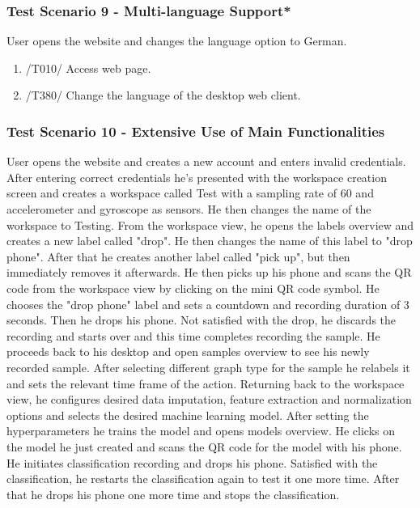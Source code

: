\subsubsection{Test Scenario 9 - Multi-language Support*}
User opens the website and changes the language option to German. 
\begin{enumerate}
    \item /T010/ Access web page.
    \item /T380/ Change the language of the desktop web client.
\end{enumerate}
\subsubsection{Test Scenario 10 - Extensive Use of Main Functionalities}
User opens the website and creates a new account and enters invalid credentials. After entering correct credentials he's presented with the workspace creation screen and creates a workspace called Test with a sampling rate of 60 and accelerometer and gyroscope as sensors. He then changes the name of the workspace to Testing. From the workspace view, he opens the labels overview and creates a new label called "drop". He then changes the name of this label to "drop phone". After that he creates another label called "pick up", but then immediately removes it afterwards. He then picks up his phone and scans the QR code from the workspace view by clicking on the mini QR code symbol. He chooses the "drop phone" label and sets a countdown and recording duration of 3 seconds. Then he drops his phone. Not satisfied with the drop, he discards the recording and starts over and this time completes recording the sample. He proceeds back to his desktop and open samples overview to see his newly recorded sample. After selecting different graph type for the sample he relabels it and sets the relevant time frame of the action. Returning back to the workspace view, he configures desired data imputation, feature extraction and normalization options and selects the desired machine learning model. After setting the hyperparameters he trains the model and opens models overview. He clicks on the model he just created and scans the QR code for the model with his phone. He initiates classification recording and drops his phone. Satisfied with the classification, he restarts the classification again to test it one more time. After that he drops his phone one more time and stops the classification.
